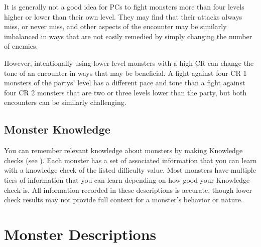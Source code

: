         It is generally not a good idea for PCs to fight monsters more than four levels higher or lower than their own level.
        They may find that their attacks always miss, or never miss, and other aspects of the encounter may be similarly imbalanced in ways that are not easily remedied by simply changing the number of enemies.

        However, intentionally using lower-level monsters with a high CR can change the tone of an encounter in ways that may be beneficial.
        A fight against four CR 1 monsters of the partys' level has a different pace and tone than a fight against four CR 2 monsters that are two or three levels lower than the party, but both encounters can be similarly challenging.

    \subsection{Monster Knowledge}
        You can remember relevant knowledge about monsters by making Knowledge checks (see ).
        Each monster has a set of associated information that you can learn with a knowledge check of the listed difficulty value.
        Most monsters have multiple tiers of information that you can learn depending on how good your Knowledge check is.
        All information recorded in these descriptions is accurate, though lower check results may not provide full context for a monster's behavior or nature.

\section{Monster Descriptions}


